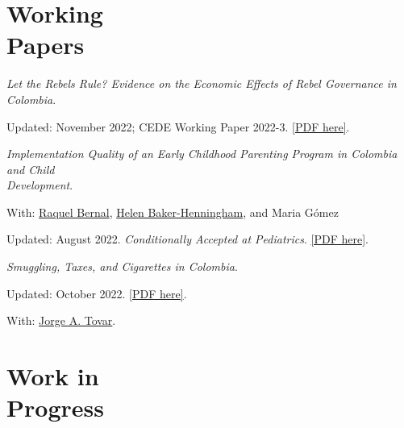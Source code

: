 \documentclass[margin,line]{res}
\newenvironment{list1}{
  \begin{list}{\ding{113}}{%
      \setlength{\itemsep}{0in}
      \setlength{\parsep}{0in} \setlength{\parskip}{0in}
      \setlength{\topsep}{0in} \setlength{\partopsep}{0in} 
      \setlength{\leftmargin}{0.17in}}}{\end{list}}
\begin{document}
\begin{resume}


\vspace{-.4cm}

\section{\sc Working \\ Papers}

\textit{Let the Rebels Rule? Evidence on the Economic Effects of Rebel Governance in Colombia}.
\begin{list1}
    \item[] Updated: November 2022; CEDE Working Paper 2022-3. \href{https://santiago-perezc.github.io/documents/masters-thesis.pdf}{[PDF here]}. 
\end{list1}


\textit{Implementation Quality of an Early Childhood Parenting Program in Colombia and Child \\ Development}.  
\begin{list1}
    \item[] With: \href{https://sites.google.com/view/raquelbernal}{Raquel Bernal}, \href{https://research.bangor.ac.uk/portal/en/researchers/helen-henningham(ab5999a9-22af-4394-b4f4-89dff9971ad1).html}{Helen Baker-Henningham}, and Maria Gómez  
    \item[] Updated: August 2022. \emph{Conditionally Accepted at Pediatrics}. \href{https://santiago-perezc.github.io/documents/Pediatrics_Submitted.pdf}{[PDF here]}.
\end{list1}


\textit{Smuggling, Taxes, and Cigarettes in Colombia}.  
\begin{list1}
    \item[] Updated: October 2022.  \href{https://santiago-perezc.github.io/documents/paper-tobacco-draft3.pdf}{[PDF here]}.
    \item[] With: \href{https://sites.google.com/view/jorgetovar/home}{Jorge A. Tovar}.
\end{list1}

\section{\sc Work in \\ Progress}


\end{resume}
\end{document}
